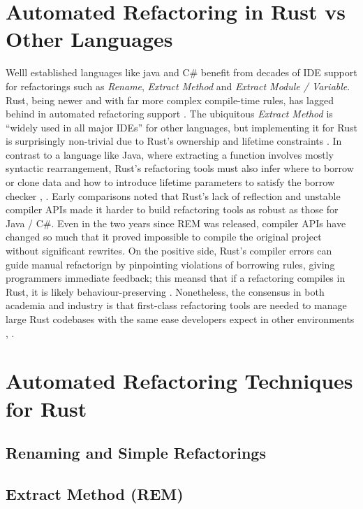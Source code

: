 \section{Automated Refactoring in Rust vs Other Languages}
\label{sec:automated_ref_rust_vs_other}
Welll established languages like java and C\# benefit from decades of IDE
support for refactorings such as \textit{Rename}, \textit{Extract Method} and
\textit{Extract Module / Variable}.
Rust, being newer and with far more complex compile-time rules, has lagged
behind in automated refactoring support \cite{AdventureOfALifetime}. The
ubiquitous \textit{Extract Method} is ``widely used in all major IDEs'' for
other languages, but implementing it for Rust is surprisingly non-trivial due to
Rust's ownership and lifetime constraints \cite{AdventureOfALifetime}. In
contrast to a language like Java, where extracting a function involves mostly
syntactic rearrangement, Rust's refactoring tools must also infer where to
borrow or clone data and how to introduce lifetime parameters to satisfy the
borrow checker \cite{automated_refactoring_of_rust_programs},
\cite{automatically_enforcing_rust_trait_properties}. Early comparisons noted
that Rust's lack of reflection and unstable compiler APIs made it harder to
build refactoring tools as robust as those for Java / C\#. Even in the two years
since REM was released, compiler APIs have changed so much that it proved
impossible to compile the original project without significant rewrites. On the
positive side, Rust's compiler errors can guide manual refactorign by
pinpointing violations of borrowing rules, giving programmers immediate
feedback; this meansd that if a refactoring compiles in Rust, it is likely
behaviour-preserving \cite{Endler_2024}. Nonetheless, the consensus in both
academia and industry is that first-class refactoring tools are needed to manage
large Rust codebases with the same ease developers expect in other environments
\cite{AdventureOfALifetime}, \cite{OneThousandOneStories-SoftwareRefactoring}.
\section{Automated Refactoring Techniques for Rust}
\label{sec:automated_ref_tech_rust}
\subsection{Renaming and Simple Refactorings}

\subsection{Extract Method (REM)}

